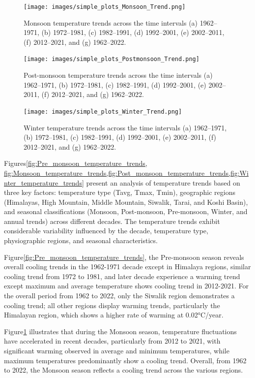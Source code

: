 \begin{figure}[H] 
  \centering
  \texttt{[image: images/simple\_plots\_Monsoon\_Trend.png]}  
  \caption{Monsoon temperature trends across the time intervals (a) 1962–1971, (b) 1972–1981, (c) 1982–1991, (d) 1992–2001, (e) 2002–2011, (f) 2012–2021, and (g) 1962–2022.} 
  \label{fig:Monsoon_temperature_trends}  
\end{figure}

\begin{figure}[H] 
  \centering
  \texttt{[image: images/simple\_plots\_Postmonsoon\_Trend.png]}
  \caption{Post-monsoon temperature trends across the time intervals (a) 1962–1971, (b) 1972–1981, (c) 1982–1991, (d) 1992–2001, (e) 2002–2011, (f) 2012–2021, and (g) 1962–2022.} 
  \label{fig:Post_monsoon_temperature_trends}  
\end{figure}

\begin{figure}[H] 
  \centering
  \texttt{[image: images/simple\_plots\_Winter\_Trend.png]}  
  \caption{Winter temperature trends across the time intervals (a) 1962–1971, (b) 1972–1981, (c) 1982–1991, (d) 1992–2001, (e) 2002–2011, (f) 2012–2021, and (g) 1962–2022.} 
  \label{fig:Winter_temperature_trends}  
\end{figure}

Figures\ref{fig:Pre_monsoon_temperature_trends, fig:Monsoon_temperature_trends,fig:Post_monsoon_temperature_trends,fig:Winter_temperature_trends}  present an analysis of temperature trends based on three key factors: temperature type (Tavg, Tmax, Tmin), geographic regions (Himalayas, High Mountain, Middle Mountain, Siwalik, Tarai, and Koshi Basin), and seasonal classifications (Monsoon, Post-monsoon, Pre-monsoon, Winter, and annual trends) across different decades. The temperature trends exhibit considerable variability influenced by the decade, temperature type, physiographic regions, and seasonal characteristics.


Figure\ref{fig:Pre_monsoon_temperature_trends}, the Pre-monsoon season reveals overall cooling trends in the 1962-1971 decade except in Himalaya regions, similar cooling trend from 1972 to 1981, and later decade experience a warming trend except maximum and average temperature shows cooling trend in 2012-2021.  For the overall period from 1962 to 2022, only the Siwalik region demonstrates a cooling trend; all other regions display warming trends, particularly the Himalayan region, which shows a higher rate of warming at 0.02°C/year.

Figure\ref{fig:Monsoon_temperature_trends} illustrates that during the Monsoon season, temperature fluctuations have accelerated in recent decades, particularly from 2012 to 2021, with significant warming observed in average and minimum temperatures, while maximum temperatures predominantly show a cooling trend. Overall, from 1962 to 2022, the Monsoon season reflects a cooling trend across the various regions.

